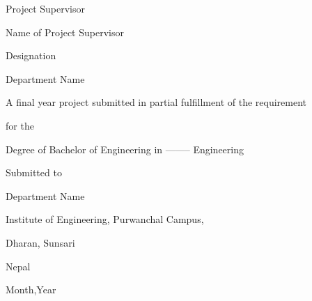 \documentclass[a4paper, 12pt ]{report}
\begin{document}
	\large\begin{center}Project Supervisor\end{center}
	\large\begin{center}Name of Project Supervisor\end{center}
	\large\begin{center}Designation\end{center}
	\large\begin{center}Department Name\end{center}
	
	\vspace*{\baselineskip}
	\large\begin{center}A final year project submitted in partial fulfillment of the requirement\end{center}
	\large\begin{center}for the \end{center}
	\large\begin{center}Degree of Bachelor of Engineering in -------- Engineering\end{center}
	\vspace*{\baselineskip}
	
	\large\begin{center}Submitted to\end{center}
	\large\begin{center}Department Name\end{center}
	\large\begin{center}Institute of Engineering, Purwanchal Campus, \end{center}
	\large\begin{center}Dharan, Sunsari \end{center}
	\large\begin{center}Nepal\end{center}
	\large\begin{center}Month,Year\end{center}
	
\end{document}
